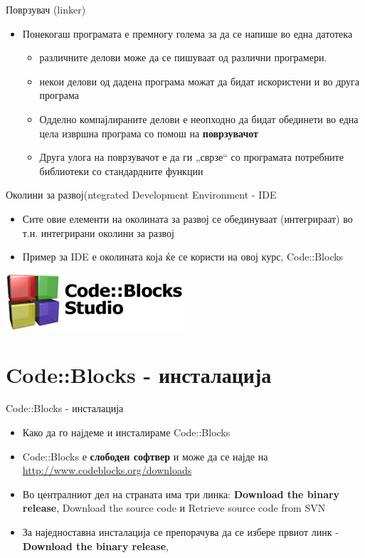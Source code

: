 \begin{frame}{Поврзувач (linker)}
\begin{itemize}
  \item Понекогаш програмата е премногу голема за да се напише во една датотека
  \begin{itemize}
    \item различните делови може да се пишуваат од различни програмери.
    \item некои делови од дадена програма можат да бидат искористени и во друга програма 
    \item Одделно компајлираните делови е неопходно да бидат обединети во една
    цела извршна програма со помош на \textbf{поврзувачот}
    \item Друга улога на поврзувачот е да ги „сврзе“ со програмата потребните
     библиотеки со стандардните функции
  \end{itemize}
\end{itemize}

\end{frame}

\begin{frame}{Околини за развој}{(ntegrated Development Environment - IDE}
\begin{itemize}
  \item Сите овие елементи на околината за развој се обединуваат (интегрираат)
  во т.н. интегрирани околини за развој
  \item Пример за IDE е околината која ќе се користи на овој курс, Code::Blocks
\end{itemize}
\begin{center}
\includegraphics[scale=0.5]{images/cb_logo}
\end{center}
\end{frame}

\section{Code::Blocks - инсталација}
\begin{frame}{Code::Blocks - инсталација}
\begin{itemize}
  \item Како да го најдеме и инсталираме Code::Blocks
  \item Code::Blocks е \textbf{слободен софтвер} и може да се најде
  на\linebreak
  \href{http://www.codeblocks.org/downloads}{http://www.codeblocks.org/downloads}
  \item Во централниот дел на страната има три линка: \textbf{Download the binary release}, Download the source code и Retrieve source code from SVN
  \item За наједноставна инсталација се препорачува да се избере првиот линк -
  \textbf{Download the binary release},
\end{itemize}
\end{frame}

